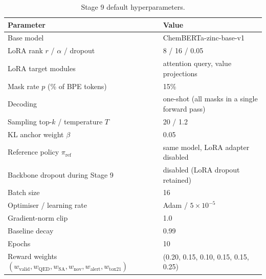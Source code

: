\begin{table}[htbp]
\centering
\caption{Stage 9 default hyperparameters.}
\label{tab:stage9-hparams}
\begin{tabular}{@{}ll@{}}
\toprule
Parameter & Value \\
\midrule
Base model & ChemBERTa-zinc-base-v1~\cite{chithrananda2020chemberta} \\
LoRA rank $r$ / $\alpha$ / dropout & 8 / 16 / 0.05 \\
LoRA target modules & attention query, value projections \\
Mask rate $p$ (\% of BPE tokens) & 15\% \\
Decoding & one-shot (all masks in a single forward pass) \\
Sampling top-$k$ / temperature $T$ & 20 / 1.2 \\
KL anchor weight $\beta$ & 0.05 \\
Reference policy $\pi_{\mathrm{ref}}$ & same model, LoRA adapter disabled \\
Backbone dropout during Stage 9 & disabled (LoRA dropout retained) \\
Batch size & 16 \\
Optimiser / learning rate & Adam / $5\times10^{-5}$ \\
Gradient-norm clip & 1.0 \\
Baseline decay & 0.99 \\
Epochs & 10 \\
Reward weights $(w_{\mathrm{valid}}, w_{\mathrm{QED}}, w_{\mathrm{SA}}, w_{\mathrm{nov}}, w_{\mathrm{alert}}, w_{\mathrm{tox21}})$ & (0.20, 0.15, 0.10, 0.15, 0.15, 0.25) \\
\bottomrule
\end{tabular}
\end{table}

